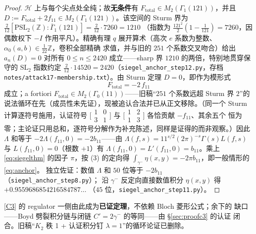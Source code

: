 \documentclass[11pt,a4paper]{ctexart}
\theoremstyle{remark}
\newcommand{\ZZ}{\mathbb{Z}}
\newcommand{\bN}{b_{11}}
\begin{document}
\begin{proof}
$\mathcal H$ 上与每个尖点处全纯；故\textbf{无条件}有
$F_{\mathrm{total}}\in M_2(\Gamma_1(121))$，并且
$D:=F_{\mathrm{total}}+2f_{11}\in M_2(\Gamma_1(121))$。该空间的 Sturm 界为
$\frac{2}{12}[\mathrm{PSL}_2(\ZZ):\bar\Gamma_1(121)]=\frac{2}{12}\cdot7260=1210$
（指数为 $\frac{121^2}{2}(1-\frac1{121})=7260$，因偶数权下 $-I$ 作用平凡）。精确有理
$q$ 展开算术（高次 $e$ 系数为整数、$\alpha_0(a,b)\in\frac1{22}\ZZ$，卷积全部精确
求值，并与旧的 $251$ 个系数交叉吻合）给出 $a_n(D)=0$ 对所有 $0\le n\le2420$
成立——sharp 界 $1210$ 的两倍，特别地贯穿保守的 $\mathrm{SL}_2$ 指数约定
$\frac{2}{12}\cdot14520=2420$（\texttt{siegel\_anchor\_step12.py}，存档
\texttt{notes/attack17-membership.txt}）。由 Sturm 定理 $D=0$，即作为模形式
\[
F_{\mathrm{total}}=-2\,f_{11}
\]
成立；a fortiori $F_{\mathrm{total}}\in M_2(\Gamma_0(11))$——旧稿``$251$ 个系数远超
Sturm 界 $2$''的说法循环在先（成员性未先证），现被追认合法并已从正文移除。（同一个
Sturm 计算逐符号施用，认证符号
$\bigl[\begin{smallmatrix}1&0\\3&1\end{smallmatrix}\bigr]$ 与
$\bigl[\begin{smallmatrix}1&2\\1&3\end{smallmatrix}\bigr]$ 各恰贡献 $-f_{11}$、其余五个
恒为零；主论证只用总和，逐符号分解作为补充陈述，同样是证得的而非观察。）因此
$\Lambda$ 和等于 $-2\Lambda(f_{11},0)=-2\bN$——由
$\Lambda(f,s)=11^{s/2}(2\pi)^{-s}\Gamma(s)L(f,s)$ 与 $L(f_{11},0)=0$（根数 $+1$）有
$\Lambda(f_{11},0)=L'(f_{11},0)=\bN$。乘上 \eqref{eq:siegelthm} 的因子 $\pi$，按 (3)
的定向得 $\int_{\gamma^-}\eta(x,y)=-2\pi\bN$，即一般情形的 \eqref{eq:anchor}。
独立佐证：数值 $\Lambda$ 和 $50$ 位等于 $-2\bN$（\texttt{siegel\_anchor\_step8.py}）；
沿 $\gamma^-$ 反定向直接数值积分 $\eta(x,y)$ 得 $+0.9559686854216584787\ldots$
（$45$ 位，\texttt{siegel\_anchor\_step11.py}）。
\end{proof}

\eqref{C3} 的 regulator 一侧由此成为\textbf{已证定理}，不依赖 Bloch 菱形公式；余下的
缺口——Boyd 劈裂积分链与闭链 $C'=2\gamma^-$ 的等同——由 \S\ref{sec:proofc3} 的认证
闭合。旧稿``$K_2$ 秩 1 + 认证积分钉 $\lambda=1$''的循环论证已删除。
\end{document}

